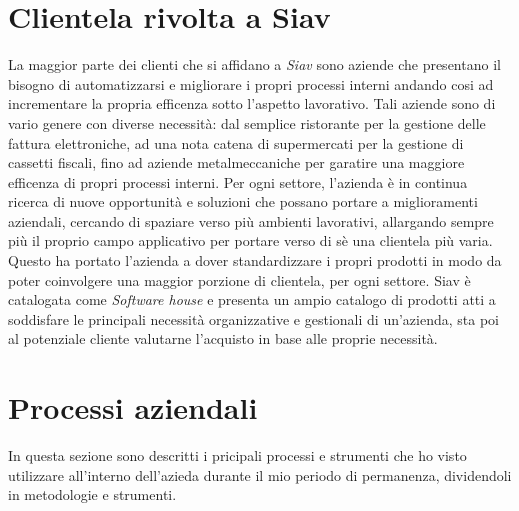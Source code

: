\section{Clientela rivolta a Siav}
La maggior parte dei clienti che si affidano a \textit{Siav} sono aziende che presentano il bisogno di automatizzarsi e migliorare i propri processi interni andando cosi ad incrementare la propria efficenza sotto l'aspetto lavorativo. Tali aziende sono di vario genere con diverse necessità: dal semplice ristorante per la gestione delle fattura elettroniche, ad una nota catena di supermercati per la gestione di cassetti fiscali, fino ad aziende metalmeccaniche per garatire una maggiore efficenza di propri processi interni. Per ogni settore, l'azienda è in continua ricerca di nuove opportunità e soluzioni che possano portare a miglioramenti aziendali, cercando di spaziare verso più ambienti lavorativi, allargando sempre più il proprio campo applicativo per portare verso di sè una clientela più varia. Questo ha portato l'azienda a dover standardizzare i propri prodotti in modo da poter coinvolgere una maggior porzione di clientela, per ogni settore.
Siav è catalogata come \textit{Software house} e presenta un ampio catalogo di prodotti atti a soddisfare le principali necessità organizzative e gestionali di un'azienda, sta poi al potenziale cliente valutarne l'acquisto in base alle proprie necessità.
\section {Processi aziendali}
In questa sezione sono descritti i pricipali processi e strumenti che ho visto utilizzare all'interno dell'azieda durante il mio periodo di permanenza, dividendoli in metodologie e strumenti.
